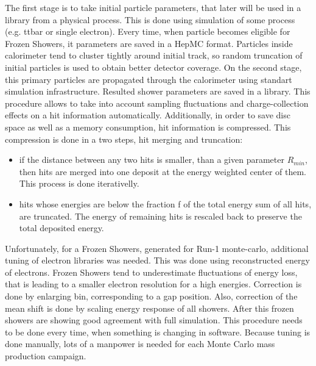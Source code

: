 The first stage is to take initial particle parameters, that later will be used in a library from a physical process. This is done using simulation of some process (e.g. ttbar or single electron). Every time, when particle becomes eligible for Frozen Showers, it parameters are saved in a HepMC format. Particles inside calorimeter tend to cluster tightly around initial track, so random truncation of initial particles is used to obtain better detector coverage. On the second stage, this primary particles are propagated through the calorimeter using standart \atlas simulation infrastructure. Resulted shower parameters are saved in a library. This procedure allows to take into account sampling fluctuations and charge-collection effects on a hit information automatically. Additionally, in order to save disc space as well as a memory consumption, hit information is compressed. This compression is done in a two steps, hit merging and truncation:
\begin{itemize}
\item if the distance between any two hits is smaller, than a given parameter $R_{min}$, then hits are merged into one deposit at the energy weighted center of them. This process is done iterativelly.
\item hits whose energies are below the fraction f of the total energy sum of all hits, are truncated. The energy of remaining hits is rescaled back to preserve the total deposited energy.
\end{itemize}

Unfortunately, for a Frozen Showers, generated for Run-1 monte-carlo, additional tuning of electron libraries was needed. This was done using reconstructed energy of electrons. Frozen Showers tend to underestimate fluctuations of energy loss, that is leading to a smaller electron resolution for a high energies. Correction is done by enlarging bin, corresponding to a gap position. Also, correction of the mean shift is done by scaling energy response of all showers. After this frozen showers are showing good agreement with full simulation. This procedure needs to be done every time, when something is changing in software. Because tuning is done manually, lots of a manpower is needed for each Monte Carlo mass production campaign.



\begin{figure}[!tbp]
\end{figure}
